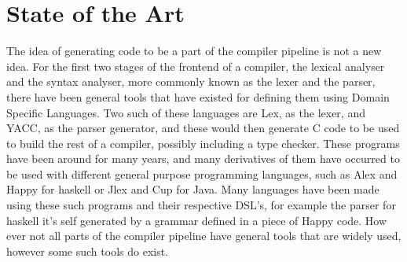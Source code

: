 \chapter{State of the Art}

The idea of generating code to be a part of the compiler pipeline is not a new idea.
For the first two stages of the frontend of a compiler, the lexical analyser and the syntax analyser, more commonly known as the lexer and the parser, there have been general tools that have existed for defining them using Domain Specific Languages\cite{Bentley:1986:PPL:6424.315691,van2000domain}.
Two such of these languages are Lex, as the lexer, and YACC, as the parser generator, and these would then generate C code to be used to build the rest of a compiler, possibly including a type checker.
These programs have been around for many years, and many derivatives of them have occurred to be used with different general purpose programming languages, such as Alex and Happy for haskell or Jlex and Cup for Java\cite{ranta2012implementing}.
Many languages have been made using these such programs and their respective DSL's, for example the parser for haskell it's self generated by a grammar defined in a piece of Happy code.
How ever not all parts of the compiler pipeline have general tools that are widely used, however some such tools do exist\cite{grimm2007typical,ruler:10.1007/11737414_4}.

